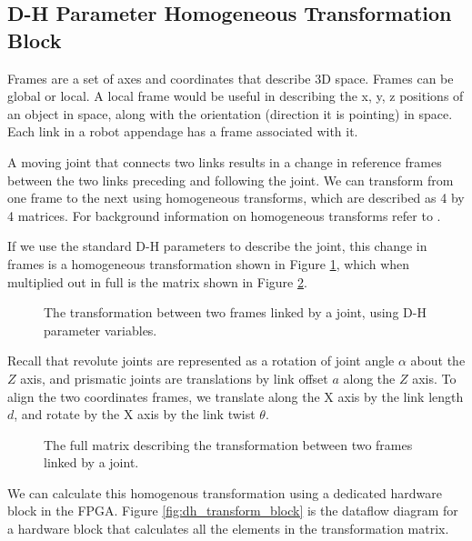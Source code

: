 \subsection{D-H Parameter Homogeneous Transformation Block}

Frames are a set of axes and coordinates that describe 3D space. Frames can be global or local. A local frame would be useful in describing the x, y, z positions of an object in space, along with the orientation (direction it is pointing) in space. Each link in a robot appendage has a frame associated with it.

A moving joint that connects two links results in a change in reference frames between the two links preceding and following the joint. We can transform from one frame to the next using homogeneous transforms, which are described as 4 by 4 matrices. For background information on homogeneous transforms refer to \cite{frames}.

If we use the standard D-H parameters to describe the joint, this change in frames is a homogeneous transformation shown in Figure \ref{fig:dh_transform_equation}, which when multiplied out in full is the matrix shown in Figure \ref{fig:dh_transform_matrix}. 

\begin{figure}[ht]
\center
{}
\caption{The transformation between two frames linked by a joint, using D-H parameter variables.}
\label{fig:dh_transform_equation}
\end{figure}

Recall that revolute joints are represented as a rotation of joint angle $\alpha$ about the $Z$ axis, and prismatic joints are translations by link offset $a$ along the $Z$ axis. To align the two coordinates frames, we translate along the X axis by the link length $d$, and rotate by the X axis by the link twist $\theta$.

\begin{figure}[ht]
\center
{}
\caption{The full matrix describing the transformation between two frames linked by a joint.}
\label{fig:dh_transform_matrix}
\end{figure}

We can calculate this homogenous transformation using a dedicated hardware block in the FPGA. Figure \ref{fig:dh_transform_block} is the dataflow diagram for a hardware block that calculates all the elements in the transformation matrix.

